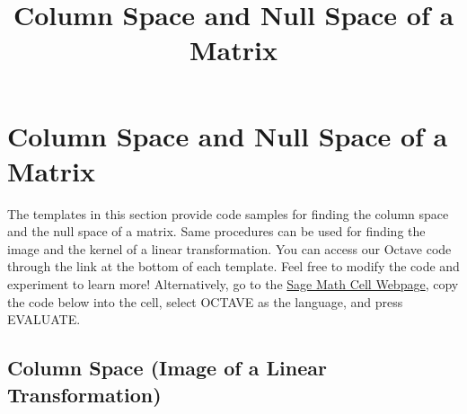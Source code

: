 \documentclass{ximera}
\title{Column Space and Null Space of a Matrix} \license{CC BY-NC-SA 4.0}
\begin{document}
\begin{abstract}
\end{abstract}
\maketitle
\section*{Column Space and Null Space of a Matrix}

The templates in this section provide code samples for finding the column space and the null space of a matrix.  Same procedures can be used for finding the image and the kernel of a linear transformation. You can access our Octave code through the link at the bottom of each template.  Feel free to modify the code and experiment to learn more!  Alternatively, go to the \href{https://sagecell.sagemath.org/}{Sage Math Cell Webpage}, copy the code below into the cell, select OCTAVE as the language, and press EVALUATE.  

\subsection*{Column Space (Image of a Linear Transformation)}
\end{document}
